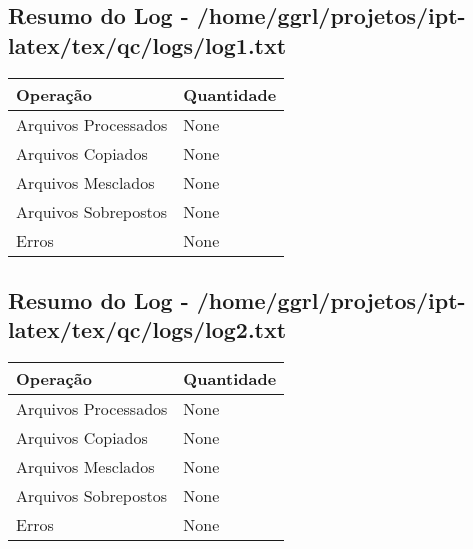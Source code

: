 
\subsection{Resumo do Log - /home/ggrl/projetos/ipt-latex/tex/qc/logs/log1.txt}
\begin{longtable}{@{}ll@{}}
\toprule
\textbf{Operação} & \textbf{Quantidade} \\ \midrule
Arquivos Processados & None \\
Arquivos Copiados    & None \\
Arquivos Mesclados   & None \\
Arquivos Sobrepostos & None \\
Erros               & None \\ \bottomrule
\end{longtable}


\subsection{Resumo do Log - /home/ggrl/projetos/ipt-latex/tex/qc/logs/log2.txt}
\begin{longtable}{@{}ll@{}}
\toprule
\textbf{Operação} & \textbf{Quantidade} \\ \midrule
Arquivos Processados & None \\
Arquivos Copiados    & None \\
Arquivos Mesclados   & None \\
Arquivos Sobrepostos & None \\
Erros               & None \\ \bottomrule
\end{longtable}
